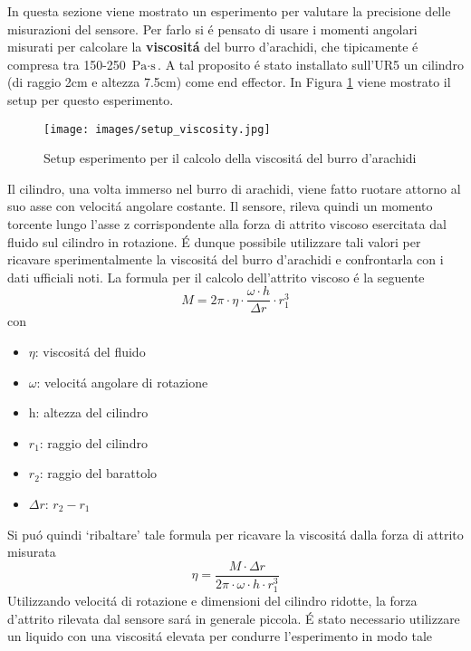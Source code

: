 In questa sezione viene mostrato un esperimento per valutare la precisione delle misurazioni del sensore. 
Per farlo si \'{e} pensato di usare i momenti angolari misurati per calcolare la \textbf{viscosit\'{a}} del burro d'arachidi, 
che tipicamente \'{e} compresa tra 150-250 $\text{Pa} \cdot \text{s}$. 
A tal proposito \'{e} stato installato sull'UR5 un cilindro (di raggio 2cm e altezza 7.5cm) come end effector. 
In Figura \ref{fig:peanut_butter} viene mostrato il setup per questo esperimento. 
\begin{figure}[H]
    \centering
    \texttt{[image: images/setup\_viscosity.jpg]}
    \caption{Setup esperimento per il calcolo della viscosit\'{a} del burro d'arachidi}
    \label{fig:peanut_butter}
\end{figure}
Il cilindro, una volta immerso nel burro di arachidi, viene fatto ruotare attorno al suo asse con velocit\'{a} angolare 
costante. Il sensore, rileva quindi un momento torcente lungo l'asse z corrispondente alla forza di attrito viscoso esercitata 
dal fluido sul cilindro in rotazione. \'{E} dunque possibile utilizzare tali valori per ricavare sperimentalmente 
la viscosit\'{a} del burro d'arachidi e confrontarla con i dati ufficiali noti. 
La formula per il calcolo dell'attrito viscoso \'{e} la seguente 
\begin{equation*}
    M = 2\pi \cdot \eta \cdot \frac{\omega \cdot h}{\Delta r} \cdot r_{1}^{3}
\end{equation*}
con 
\begin{itemize}
    \item $\eta$: viscosit\'{a} del fluido
    \item $\omega$: velocit\'{a} angolare di rotazione
    \item h: altezza del cilindro
    \item $r_{1}$: raggio del cilindro
    \item $r_{2}$: raggio del barattolo
    \item $\Delta r$: $r_{2} - r_{1}$
\end{itemize}
Si pu\'{o} quindi `ribaltare' tale formula per ricavare la viscosit\'{a} dalla forza di attrito misurata 
\begin{equation} \label{eq:eta}
    \eta = \frac{M \cdot \Delta r}{2\pi \cdot \omega \cdot h \cdot r_{1}^{3}}
\end{equation}
Utilizzando velocit\'{a} di rotazione e dimensioni del cilindro ridotte, la forza d'attrito rilevata dal sensore sar\'{a} in generale 
piccola. \'{E} stato necessario utilizzare un liquido con una viscosit\'{a} elevata per condurre l'esperimento in modo tale 
